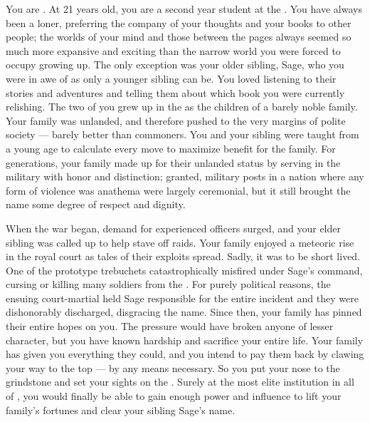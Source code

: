 \documentclass[char]{GL2020}
\begin{document}
\name{\cLibAssist{}}

You are \cLibAssist{\intro}. At 21 years old, you are a second year student at the \pSchool{}. You have always been a loner, preferring the company of your thoughts and your books to other people; the worlds of your mind and those between the pages always seemed so much more expansive and exciting than the narrow world you were forced to occupy growing up. The only exception was your older sibling, Sage, who you were in awe of as only a younger sibling can be. You loved listening to their stories and adventures and telling them about which book you were currently relishing. The two of you grew up in the \pFarm{} as the children of a barely noble family. Your family was unlanded, and therefore pushed to the very margins of polite society — barely better than commoners. You and your sibling were taught from a young age to calculate every move to maximize benefit for the family. For generations, your family made up for their unlanded status by serving in the military with honor and distinction; granted, military posts in a nation where any form of violence was anathema were largely ceremonial, but it still brought the \cLibAssist{\formal} name some degree of respect and dignity. 

When the war began, demand for experienced officers surged, and your elder sibling was called up to help stave off \pShippie{} raids. Your family enjoyed a meteoric rise in the royal court as tales of their exploits spread. Sadly, it was to be short lived. One of the prototype trebuchets catastrophically misfired under Sage’s command, cursing or killing many soldiers from the \pTech{}. For purely political reasons, the ensuing court-martial held Sage responsible for the entire incident and they were dishonorably discharged, disgracing the \cLibAssist{\formal} name. Since then, your family has pinned their entire hopes on you. The pressure would have broken anyone of lesser character, but you have known hardship and sacrifice your entire life. Your family has given you everything they could, and you intend to pay them back by clawing your way to the top — by any means necessary. So you put your nose to the grindstone and set your sights on the \pSchool{}. Surely at the most elite institution in all of \pEarth{}, you would finally be able to gain enough power and influence to lift your family’s fortunes and clear your sibling Sage’s name.
\end{document}
